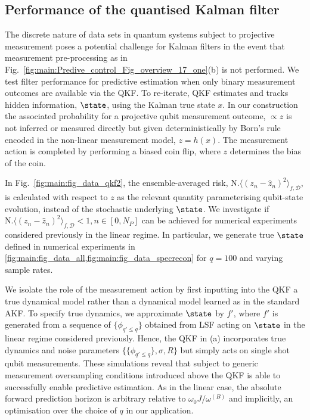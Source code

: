 \subsection{Performance of the quantised Kalman filter}
The discrete nature of data sets in quantum systems subject to projective measurement poses a potential challenge for Kalman filters in the event that measurement pre-processing as in Fig.~\ref{fig:main:Predive_control_Fig_overview_17_one}(b) is not performed.  We test filter performance for predictive estimation when only binary measurement outcomes are available via the QKF.  To re-iterate, QKF estimates and tracks hidden information, $\state$, using the Kalman true state $x$.  In our construction the associated probability for a projective qubit measurement outcome, $\propto z$ is not inferred or measured directly but given deterministically by Born's rule encoded in the non-linear measurement model, $z = h(x)$. The measurement action is completed by performing a biased coin flip, where $z$ determines the bias of the coin.  

In Fig.~\ref{fig:main:fig_data_qkf2}, the ensemble-averaged risk, $\text{N.} \langle (z_n - \hat{z}_n)^2 \rangle_{f, \mathcal{D}} $, is calculated with respect to $z$ as the relevant quantity parameterising qubit-state evolution, instead of the stochastic underlying $\state$. We investigate if $\text{N.} \langle (z_n - \hat{z}_n)^2 \rangle_{f, \mathcal{D}} < 1, n\in [0, N_P] $ can be achieved for numerical experiments considered previously in the linear regime. In particular, we generate true $\state$ defined in numerical experiments in \cref{fig:main:fig_data_all,fig:main:fig_data_specrecon} for $q=100$ and varying sample rates.

We isolate the role of the measurement action by first inputting into the QKF a true dynamical model rather than a dynamical model learned as in the standard AKF.  To specify true dynamics, we approximate $\state$ by $f'$, where $f'$ is generated from a sequence of $\{ \phi_{q'\leq q}\}$ obtained from LSF acting on $\state$ in the linear regime considered previously.  Hence, the QKF in (a) incorporates true dynamics and noise parameters $\{\{\phi_{q' \leq q} \}, \sigma, R\}$ but simply acts on single shot qubit measurements.  These simulations reveal that subject to generic measurement oversampling conditions introduced above the QKF is able to successfully enable predictive estimation.  As in the linear case, the absolute forward prediction horizon is arbitrary relative to $\omega_0 J / \omega^{(B)}$ and implicitly, an optimisation over the choice of $q$ in our application. 

